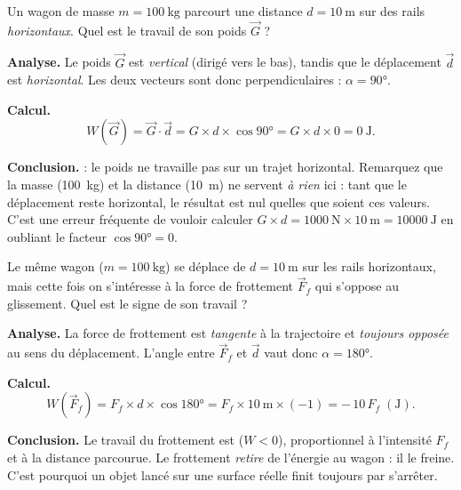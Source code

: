 \documentclass[11pt,a4paper]{article}
\newcommand{\vv}[1]{\vec{#1}}
\begin{document}
\begin{exemple}
Un wagon de masse $m=\SI{100}{\kilogram}$ parcourt une distance $d=\SI{10}{\metre}$ sur des rails
\emph{horizontaux}. Quel est le travail de son poids $\vv G$ ?

\smallskip
\textbf{Analyse.} Le poids $\vv G$ est \emph{vertical} (dirigé vers le bas), tandis que le
déplacement $\vv d$ est \emph{horizontal}. Les deux vecteurs sont donc perpendiculaires :
$\alpha=\ang{90}$.

\textbf{Calcul.}
\[
W(\vv G)=\vv G\cdot\vv d=G\times d\times\cos\ang{90}=G\times d\times 0=\SI{0}{\joule}.
\]

\textbf{Conclusion.} \boxed{W(\vv G)=\SI{0}{\joule}} \; : le poids ne travaille pas sur un trajet
horizontal. Remarquez que la masse (\SI{100}{\kilogram}) et la distance (\SI{10}{\metre}) ne servent
\emph{à rien} ici : tant que le déplacement reste horizontal, le résultat est nul quelles que soient
ces valeurs. C'est une erreur fréquente de vouloir calculer $G\times d=\SI{1000}{\newton}\times\SI{10}{\metre}=\SI{10000}{\joule}$
en oubliant le facteur $\cos\ang{90}=0$.
\end{exemple}

\begin{exemple}
Le même wagon ($m=\SI{100}{\kilogram}$) se déplace de $d=\SI{10}{\metre}$ sur les rails horizontaux,
mais cette fois on s'intéresse à la force de frottement $\vv F_f$ qui s'oppose au glissement.
Quel est le signe de son travail ?

\smallskip
\textbf{Analyse.} La force de frottement est \emph{tangente} à la trajectoire et \emph{toujours
opposée} au sens du déplacement. L'angle entre $\vv F_f$ et $\vv d$ vaut donc $\alpha=\ang{180}$.

\textbf{Calcul.}
\[
W(\vv F_f)=F_f\times d\times\cos\ang{180}=F_f\times \SI{10}{\metre}\times(-1)=-\,10\,F_f \;(\si{\joule}).
\]

\textbf{Conclusion.} Le travail du frottement est  ($W<0$), proportionnel à
l'intensité $F_f$ et à la distance parcourue. Le frottement \emph{retire} de l'énergie au wagon : il
le freine. C'est pourquoi un objet lancé sur une surface réelle finit toujours par s'arrêter.
\end{exemple}
\end{document}

